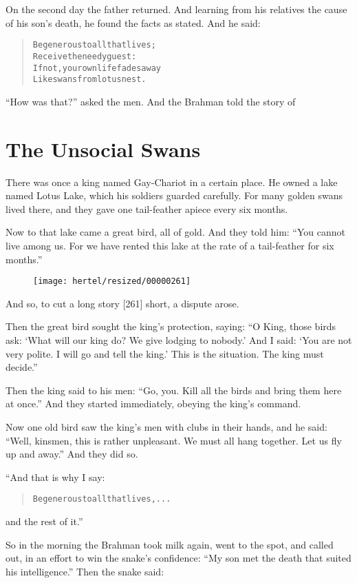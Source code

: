 \documentclass[article, twoside, 10pt]{memoir}
\renewenvironment{verbatim}{%
\begin{quote}%
\vskip -10pt%
\begin{alltt}\normalfont\small}{\end{alltt}%
\end{quote}%
\vskip -10pt
} %
\begin{document}
On the second day the father returned. And learning from his
relatives the cause of his son's death, he found the facts as
stated. And he said:

\begin{verbatim}
Be generous to all that lives;
    Receive the needy guest:
If not, your own life fades away
    Like swans from lotus nest.
\end{verbatim}
``How was that?'' asked the men. And the Brahman told the story of

\chapter{The Unsocial Swans}

There was once a king named Gay-Chariot in a certain place. He
owned a lake named Lotus Lake, which his soldiers guarded
carefully. For many golden swans lived there, and they gave one
tail-feather apiece every six months.

Now to that lake came a great bird, all of gold. And they told him:
``You cannot live among us. For we have rented this lake at the rate of a tail-feather for six months.''
\begin{figure}[p]\texttt{[image: hertel/resized/00000261]}\end{figure}And so, to cut a long story [261] short, a dispute arose.

Then the great bird sought the king's protection, saying:
``O King, those birds ask: `What will our king do? We give lodging to nobody.' And I said: `You are not very polite. I will go and tell the king.' This is the situation. The king must decide.''

Then the king said to his men:
``Go, you. Kill all the birds and bring them here at once.'' And
they started immediately, obeying the king's command.

Now one old bird saw the king's men with clubs in their hands, and
he said:
``Well, kinsmen, this is rather unpleasant. We must all hang together. Let us fly up and away.''
And they did so.

“And that is why I say:

\begin{verbatim}
Be generous to all that lives, . . .
\end{verbatim}
and the rest of it.”

So in the morning the Brahman took milk again, went to the spot,
and called out, in an effort to win the snake's confidence:
``My son met the death that suited his intelligence.'' Then the
snake said:
\end{document}
